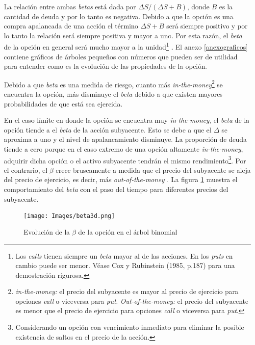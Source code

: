 La relación entre ambas \textit{betas} está dada por $\Delta S/(\Delta S + B)$, donde $B$ es la cantidad de deuda y por lo tanto es negativa. Debido a que la opción es una compra apalancada de una acción el término $\Delta S + B$ será siempre positivo y por lo tanto la relación será siempre positiva y mayor a uno. Por esta razón, el \textit{beta} de la opción en general será mucho mayor a la unidad\footnote{Los \textit{calls} tienen siempre un \textit{beta} mayor al de las acciones. En los \textit{puts} en cambio puede ser menor. Véase Cox y Rubinstein (1985, p.187) \nocite{optionsmarkets} para una demostración rigurosa.} \cite{optionsmarkets}. El anexo \ref{anexograficos} contiene gráficos de árboles pequeños con números que pueden ser de utilidad para entender como es la evolución de las propiedades de la opción.

Debido a que \textit{beta} es una medida de riesgo, cuanto más \textit{in-the-money}\footnote{\textit{in-the-money:} el precio del subyacente es mayor al precio de ejercicio para opciones \textit{call} o viceversa para \textit{put}. \textit{Out-of-the-money:} el precio del subyacente es menor que el precio de ejercicio para opciones \textit{call} o viceversa para \textit{put}.} se encuentra la opción, más disminuye el \textit{beta} debido a que existen mayores probabilidades de que está sea ejercida. 

En el caso límite en donde la opción se encuentra muy \textit{in-the-money}, el \textit{beta} de la opción tiende a el \textit{beta} de la acción subyacente. Esto se debe a que el $\Delta$ se aproxima a uno y el nivel de apalancamiento disminuye. La proporción de deuda tiende a cero porque en el caso extremo de una opción altamente \textit{in-the-money}, adquirir dicha opción o el activo subyacente tendrán el mismo rendimiento\footnote{Considerando un opción con vencimiento inmediato para eliminar la posible existencia de saltos en el precio de la acción.}. Por el contrario, el $\beta$ crece bruscamente a medida que el precio del subyacente se aleja del precio de ejercicio, es decir, más \textit{out-of-the-money} \cite{appliedderiv}. La figura \ref{fig:beta3d} muestra el comportamiento del \textit{beta} con el paso del tiempo para diferentes precios del subyacente. 

\begin{figure}[H]
\centering
\texttt{[image: Images/beta3d.png]}
\caption{Evolución de la $\beta$ de la opción en el árbol binomial}
\label{fig:beta3d}
\end{figure}

